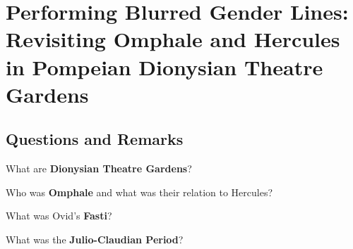 %
%
%
\chapter{Performing Blurred Gender Lines: Revisiting Omphale and Hercules in Pompeian Dionysian Theatre Gardens}
\label{BlurGender} %








\abstract{}

\section{Questions and Remarks}
\label{sec:QR15}

\begin{qst}
    What are \textbf{Dionysian Theatre Gardens}?
\end{qst}


\begin{qst}
    Who was \textbf{Omphale} and what was their relation to Hercules?
\end{qst}


\begin{qst}
    What was Ovid's \textbf{Fasti}?
\end{qst}

\begin{qst}
    What was the \textbf{Julio-Claudian Period}?
\end{qst}



